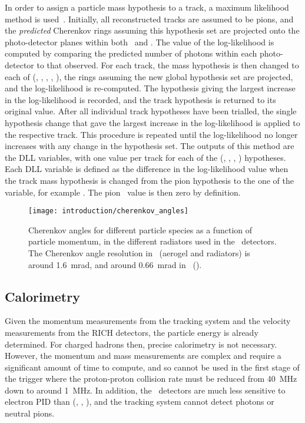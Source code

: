 In order to assign a particle mass hypothesis to a track, a maximum likelihood 
method is used~\cite{Forty:1998eqa}.
Initially, all reconstructed tracks are assumed to be pions, and the 
\emph{predicted} Cherenkov rings assuming this hypothesis set are projected 
onto the photo-detector planes within both \richone\ and \richtwo.
The value of the log-likelihood is computed by comparing the predicted number 
of photons within each photo-detector to that observed.
For each track, the mass hypothesis is then changed to each of (\Pe, \Pmu, 
\Ppi, \PK, \Pproton), the rings assuming the new global hypothesis set are 
projected, and the log-likelihood is re-computed.
The hypothesis giving the largest increase in the log-likelihood is recorded, 
and the track hypothesis is returned to its original value.
After all individual track hypotheses have been trialled, the single hypothesis 
change that gave the largest increase in the log-likelihood is applied to the 
respective track.
This procedure is repeated until the log-likelihood no longer increases with 
any change in the hypothesis set.
The outputs of this method are the \ac{DLL} variables, with one value per track 
for each of the (\Pe, \Pmu, \PK, \Pproton) hypotheses.
Each \ac{DLL} variable is defined as the difference in the log-likelihood value 
when the track mass hypothesis is changed from the pion hypothesis to the one 
of the variable, for example \dllkpi.
The pion \dll\ value is then zero by definition.

\begin{figure}
  \centering
  \texttt{[image: introduction/cherenkov\_angles]}
  \caption{%
    Cherenkov angles for different particle species as a function of particle 
    momentum, in the different radiators used in the \rich\ detectors.
    The Cherenkov angle resolution in \richone~(aerogel and  
    radiators) is around \SI{1.6}{\milli\radian}, and around 
    \SI{0.66}{\milli\radian} in \richtwo~().
  }
  \label{fig:intro:lhcb:cherenkov_angles}
\end{figure}

\subsection{Calorimetry}
\label{chap:intro:lhcb:detector:calo}

Given the momentum measurements from the tracking system and the velocity 
measurements from the \ac{RICH} detectors, the particle energy is already 
determined.
For charged hadrons then, precise calorimetry is not necessary.
However, the momentum and mass measurements are complex and require a 
significant amount of time to compute, and so cannot be used in the first stage 
of the trigger where the proton-proton collision rate must be reduced from 
\SI{40}{\mega\hertz} down to around \SI{1}{\mega\hertz}.
In addition, the \rich\ detectors are much less sensitive to electron \ac{PID} 
than (\Ppi, \PK, \Pproton), and the tracking system cannot detect photons or 
neutral pions.

